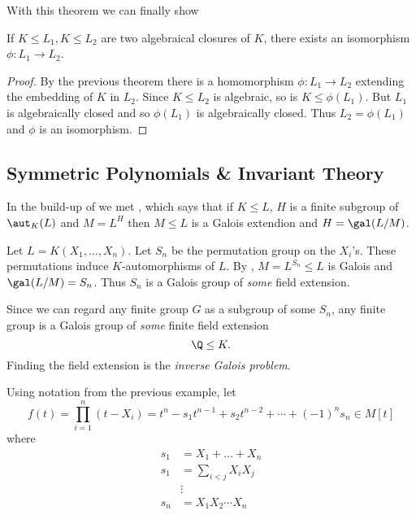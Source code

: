 \documentclass[a4paper]{article}
\begin{document}
With this theorem we can finally show

\begin{theorem}
  If \(K \leq L_1, K \leq L_2\) are two algebraical closures of \(K\), there exists an isomorphism \(\phi: L_1 \to L_2\).
\end{theorem}

\begin{proof}
  By the previous theorem there is a homomorphism \(\phi: L_1 \to L_2\) extending the embedding of \(K\) in \(L_2\). Since \(K \leq L_2\) is algebraic, so is \(K \leq \phi(L_1)\). But \(L_1\) is algebraically closed and so \(\phi(L_1)\) is algebraically closed. Thus \(L_2 = \phi(L_1)\) and \(\phi\) is an isomorphism.
\end{proof}

\subsection{Symmetric Polynomials \& Invariant Theory}

In the build-up of  we met , which says that if \(K \leq L\), \(H\) is a finite subgroup of \(\aut_K(L)\) and \(M = L^H\) then \(M \leq L\) is a Galois extendion and \(H = \gal(L/M)\).

\begin{eg}
  Let \(L = K(X_1, \dots, X_n)\). Let \(S_n\) be the permutation group on the \(X_i\)'s. These permutations induce \(K\)-automorphisms of \(L\). By , \(M = L^{S_n} \leq L\) is Galois and \(\gal(L/M) = S_n\). Thus \(S_n\) is a Galois group of \emph{some} field extension.

\end{eg}

Since we can regard any finite group \(G\) as a subgroup of some \(S_n\), any finite group is a Galois group of \emph{some} finite field extension
\[
  \Q \leq K.
\]
Finding the field extension is the \emph{inverse Galois problem}.

Using notation from the previous example, let
\[
  f(t) = \prod_{i = 1}^n (t - X_i) = t^n - s_1 t^{n - 1} + s_2 t^{n - 2} + \cdots + (-1)^n s_n \in M[t]
\]
where
\begin{align*}
  s_1 &= X_1 + \dots + X_n \\
  s_1 &= \sum_{i < j} X_iX_j \\
      &\vdots \\
  s_n &= X_1X_2\cdots X_n
\end{align*}
\end{document}
